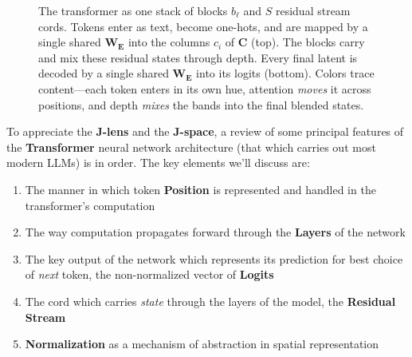 \documentclass{article}
\newcommand{\logits}{\mathrm{logits}}
\begin{document}
\begin{figure}[htbp]
{}
\caption{The transformer as one stack of blocks $b_\ell$ and $S$ residual stream cords. Tokens enter as text, become one-hots, and are mapped by a single shared \(\mathbf{W_E}\) into the columns $c_i$ of $\mathbf{C}$ (top). The blocks carry and mix these residual states through depth. Every final latent is decoded by a single shared \(\mathbf{W_E}\) into its logits (bottom). Colors trace content---each token enters in its own hue, attention \emph{moves} it across positions, and depth \emph{mixes} the bands into the final blended states.}
\label{fig:transformer-grid}
\end{figure}



To appreciate the \textbf{J-lens} and the \textbf{J-space}, a review of some principal features of the \textbf{Transformer} neural network architecture (that which carries out most modern LLMs) is in order. The key elements we'll discuss are:

\begin{enumerate}
    \item The manner in which token \textbf{Position} is represented and handled in the transformer's computation
    \item The way computation propagates forward through the \textbf{Layers} of the network
    \item The key output of the network which represents its prediction for best choice of \textit{next} token, the non-normalized vector of \textbf{Logits}
    \item The cord which carries \textit{state} through the layers of the model, the \textbf{Residual Stream}
    \item \textbf{Normalization} as a mechanism of abstraction in spatial representation
\end{enumerate}
\end{document}
